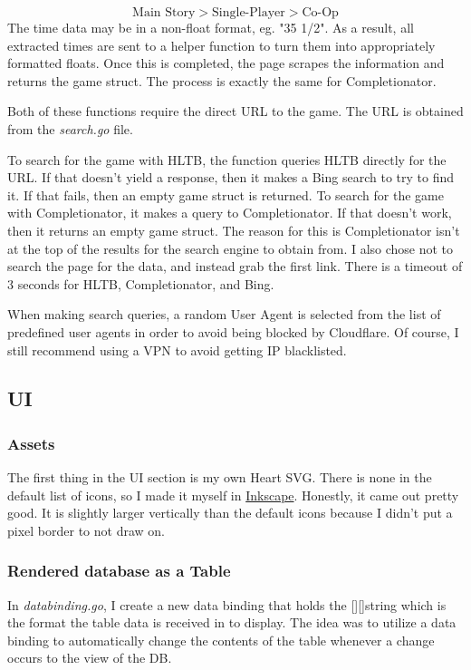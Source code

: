 \[
	\text{Main Story} > \text{Single-Player} > \text{Co-Op}
\]
The time data may be in a non-float format, eg. "35 1/2".
As a result, all extracted times are sent to a helper function to
turn them into appropriately formatted floats.
Once this is completed, the page scrapes the information and returns
the game struct. The process is exactly the same for Completionator.

Both of these functions require the direct URL to the game.
The URL is obtained from the \textit{search.go} file.

To search for the game with HLTB, the function queries HLTB directly for
the URL. If that doesn't yield a response, then it makes a Bing
search to try to find it.
If that fails, then an empty game struct is returned. To search
for the game with Completionator, it makes a query to Completionator.
If that doesn't work, then it returns an empty game struct.
The reason for this is Completionator isn't at the top of the
results for the search engine to obtain from. I also chose not to
search the page for the data, and instead grab the first link. There
is a timeout of 3 seconds for HLTB, Completionator, and Bing.

When making search queries, a random User Agent is selected from the
list of predefined user agents in order to avoid being blocked by
Cloudflare. Of course, I still recommend using a VPN to avoid getting
IP blacklisted.

\subsection{UI}
\label{subsec:UI}

\subsubsection{Assets}
\label{subsubsec:Assets}

The first thing in the UI section is my own Heart SVG. There is none
in the default list of icons, so I made it myself in
\href{https://inkscape.org/}{Inkscape}.
Honestly, it came out pretty good. It is slightly larger vertically
than the default icons because I didn't put a pixel border to not draw on.

\subsubsection{Rendered database as a Table}

In \textit{databinding.go}, I create a new data binding that holds
the [][]string which is the format the table data is received in to
display. The idea was to utilize a data binding to automatically
change the contents of the table whenever a change occurs to the view of the DB.

